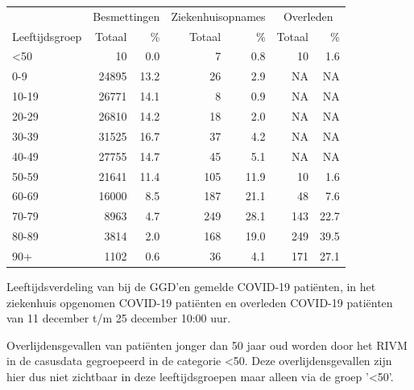 \documentclass[
  english,
  man,floatsintext]{apa6}
\begin{document}
\begin{table}
\centering\begingroup\fontsize{11}{13}\selectfont

\begin{threeparttable}
\begin{tabular}{lrrrrrr}
\toprule
\multicolumn{1}{c}{ } & \multicolumn{2}{c}{Besmettingen} & \multicolumn{2}{c}{Ziekenhuisopnames} & \multicolumn{2}{c}{Overleden} \\
\cmidrule(l{3pt}r{3pt}){2-3} \cmidrule(l{3pt}r{3pt}){4-5} \cmidrule(l{3pt}r{3pt}){6-7}
Leeftijdsgroep & Totaal & \% & Totaal & \% & Totaal & \%\\
\midrule
<50 & 10 & 0.0 & 7 & 0.8 & 10 & 1.6\\
0-9 & 24895 & 13.2 & 26 & 2.9 & NA & NA\\
10-19 & 26771 & 14.1 & 8 & 0.9 & NA & NA\\
20-29 & 26810 & 14.2 & 18 & 2.0 & NA & NA\\
30-39 & 31525 & 16.7 & 37 & 4.2 & NA & NA\\
40-49 & 27755 & 14.7 & 45 & 5.1 & NA & NA\\
50-59 & 21641 & 11.4 & 105 & 11.9 & 10 & 1.6\\
60-69 & 16000 & 8.5 & 187 & 21.1 & 48 & 7.6\\
70-79 & 8963 & 4.7 & 249 & 28.1 & 143 & 22.7\\
80-89 & 3814 & 2.0 & 168 & 19.0 & 249 & 39.5\\
90+ & 1102 & 0.6 & 36 & 4.1 & 171 & 27.1\\
\bottomrule
\end{tabular}
\begin{tablenotes}
\item[1] Leeftijdsverdeling van bij de GGD’en gemelde COVID-19 patiënten, in het ziekenhuis opgenomen COVID-19 patiënten en overleden COVID-19 patiënten van 11 december t/m 25 december 10:00 uur.
\item[2] Overlijdensgevallen van patiënten jonger dan 50 jaar oud worden door het RIVM in de casusdata gegroepeerd in de categorie <50. Deze overlijdensgevallen zijn hier dus niet zichtbaar in deze leeftijdsgroepen maar alleen via de groep '<50'.
\end{tablenotes}
\end{threeparttable}
\endgroup{}
\end{table}

\newpage
\end{document}
